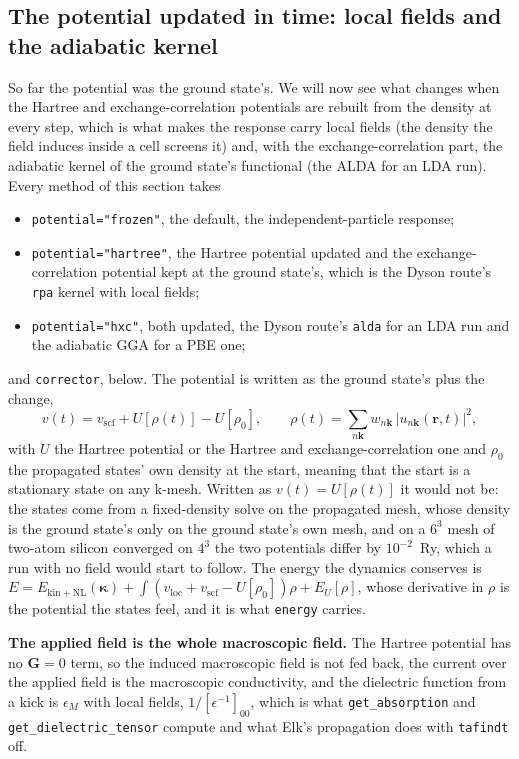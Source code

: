 \documentclass[11pt,a4paper]{article}
\newcommand{\code}[1]{\texttt{\small #1}}
\begin{document}
\subsection{The potential updated in time: local fields and the adiabatic kernel}

So far the potential was the ground state's. We will now see what changes when
the Hartree and exchange-correlation potentials are rebuilt from the density at
every step, which is what makes the response carry local fields (the density
the field induces inside a cell screens it) and, with the exchange-correlation
part, the adiabatic kernel of the ground state's functional (the ALDA for an
LDA run). Every method of this section takes
\begin{itemize}
\item \code{potential="frozen"}, the default, the independent-particle response;
\item \code{potential="hartree"}, the Hartree potential updated and the
  exchange-correlation potential kept at the ground state's, which is the
  Dyson route's \code{rpa} kernel with local fields;
\item \code{potential="hxc"}, both updated, the Dyson route's \code{alda} for an
  LDA run and the adiabatic GGA for a PBE one;
\end{itemize}
and \code{corrector}, below. The potential is written as the ground state's plus
the change,
\begin{equation*}
v(t) = v_{\mathrm{scf}} + U[\rho(t)] - U[\rho_0],\qquad
\rho(t) = \sum_{n\mathbf k} w_{n\mathbf k}\,|u_{n\mathbf k}(\mathbf r,t)|^2,
\end{equation*}
with $U$ the Hartree potential or the Hartree and exchange-correlation one and
$\rho_0$ the propagated states' own density at the start, meaning that the start
is a stationary state on any k-mesh. Written as $v(t) = U[\rho(t)]$ it would not
be: the states come from a fixed-density solve on the propagated mesh, whose
density is the ground state's only on the ground state's own mesh, and on a
$6^3$ mesh of two-atom silicon converged on $4^3$ the two potentials differ by
$10^{-2}$~Ry, which a run with no field would start to follow. The energy the
dynamics conserves is
$E = E_{\mathrm{kin+NL}}(\boldsymbol\kappa) + \int(v_{\mathrm{loc}} + v_{\mathrm{scf}} - U[\rho_0])\rho
+ E_U[\rho]$, whose derivative in $\rho$ is the potential the states feel, and it
is what \code{energy} carries.

\textbf{The applied field is the whole macroscopic field.} The Hartree potential
has no $\mathbf G=0$ term, so the induced macroscopic field is not fed back, the
current over the applied field is the macroscopic conductivity, and the
dielectric function from a kick is $\epsilon_M$ with local fields,
$1/[\epsilon^{-1}]_{00}$, which is what \code{get\_absorption} and
\code{get\_dielectric\_tensor} compute and what Elk's propagation does with
\code{tafindt} off.
\end{document}
